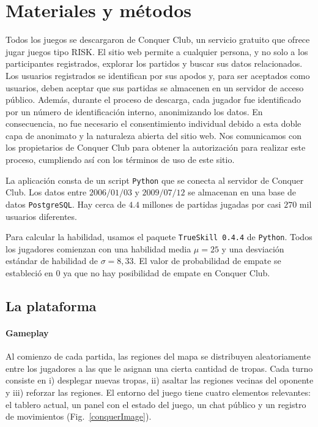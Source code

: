 \documentclass[a4paper,11pt]{book}
\theoremstyle{definition}
\begin{document}
\section{Materiales y métodos}

Todos los juegos se descargaron de Conquer Club, un servicio gratuito que ofrece jugar juegos tipo RISK.
%
El sitio web permite a cualquier persona, y no solo a los participantes registrados, explorar los partidos y buscar sus datos relacionados.
%
Los usuarios registrados se identifican por sus apodos y, para ser aceptados como usuarios, deben aceptar que sus partidas se almacenen en un servidor de acceso p\'ublico.
%
Además, durante el proceso de descarga, cada jugador fue identificado por un n\'umero de identificaci\'on interno, anonimizando los datos.
%
En consecuencia, no fue necesario el consentimiento individual debido a esta doble capa de anonimato y la naturaleza abierta del sitio web.
%
Nos comunicamos con los propietarios de Conquer Club para obtener la autorizaci\'on para realizar este proceso, cumpliendo as\'i con los términos de uso de este sitio.


La aplicaci\'on consta de un script \texttt{Python} que se conecta al servidor de Conquer Club.
%
Los datos entre $2006/01/03$ y $2009/07/12$ se almacenan en una base de datos \texttt{PostgreSQL}.
Hay cerca de $4.4$ millones de partidas jugadas por casi $270$ mil usuarios diferentes.

Para calcular la habilidad, usamos el paquete \texttt{TrueSkill 0.4.4} de \texttt{Python}.
%
Todos los jugadores comienzan con una habilidad media $\mu = 25$ y una desviaci\'on estándar de habilidad de $\sigma = 8,33$.
%
El valor de probabilidad de empate se estableci\'o en 0 ya que no hay posibilidad de empate en Conquer Club.

\subsection{La plataforma}

\paragraph{Gameplay}\label{sub:gameplay}

Al comienzo de cada partida, las regiones del mapa se distribuyen aleatoriamente entre los jugadores a las que le asignan una cierta cantidad de tropas.
%
Cada turno consiste en i) desplegar nuevas tropas, ii) asaltar las regiones vecinas del oponente y iii) reforzar las regiones.
%
El entorno del juego tiene cuatro elementos relevantes: el tablero actual, un panel con el estado del juego, un chat p\'ublico y un registro de movimientos (Fig.~\ref{conquerImage}).
\end{document}
